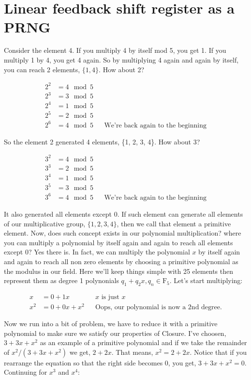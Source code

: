 \documentclass{article}
\begin{document}
\section{Linear feedback shift register as a PRNG}

Consider the element 4. If you multiply 4 by itself mod 5, you get
1. If you multiply 1 by 4, you get 4 again. So by multiplying 4
again and again by itself, you can reach 2 elements, $\{1,4\}$. How about
2?

\begin{align*}
  2^2 &= 4 \mod 5\\
  2^3 &= 3 \mod 5 \\
  2^4 &= 1 \mod 5 \\
  2^5 &= 2 \mod 5 \\
  2^6 &= 4 \mod 5 && \textrm{We're back again to the beginning}
\end{align*}

So the element 2 generated 4 elements, \{1, 2, 3, 4\}. How about
3?

\begin{align*}
  3^2 &= 4 \mod 5 \\
  3^3 &= 2 \mod 5 \\
  3^4 &= 1 \mod 5 \\
  3^5 &= 3 \mod 5 \\
  3^6 &= 4 \mod 5 && \textrm{We're back again to the beginning}
\end{align*}

It also generated all elements except 0. If such element can generate
all elements of our multiplicative group, $\{1, 2, 3, 4\}$, then we call that element a primitive element.
Now, does such concept exists
in our polynomial multiplication? where you can multiply a polynomial
by itself again and again to reach all elements except 0? Yes there is.
In fact, we can multiply the polynomial $x$ by itself again and again
to reach all non zero elements by choosing a primitive polynomial as the
modulus in our field. Here we'll keep things simple with 25 elements then represent them as degree
1 polynonials $q_1 + q_2x, q_n \in \mathrm{F}_5$. Let's start multiplying: 

\begin{align*}
  x &= 0 + 1x && \textrm{$x$ is just $x$} \\
  x^2 &= 0 + 0x + x^2 && \textrm{Oops, our polynomial is now a 2nd degree.}
\end{align*}

Now we run into a bit of problem, we have to reduce it with a primitive polynomial
to make sure we satisfy our properties of Closure. I've choosen, $3 + 3x + x^2$ as an example of a primitive polynomial and if we take the remainder
of $x^2/(3 + 3x + x^2)$ we get, $2 + 2x$.  That means, $x^2 = 2 + 2x$.  Notice that if you rearrange the equation so that the right side becomes 0, you get, $3 + 3x + x^2 = 0$. Continuing
for $x^3$ and $x^4$:
\end{document}
